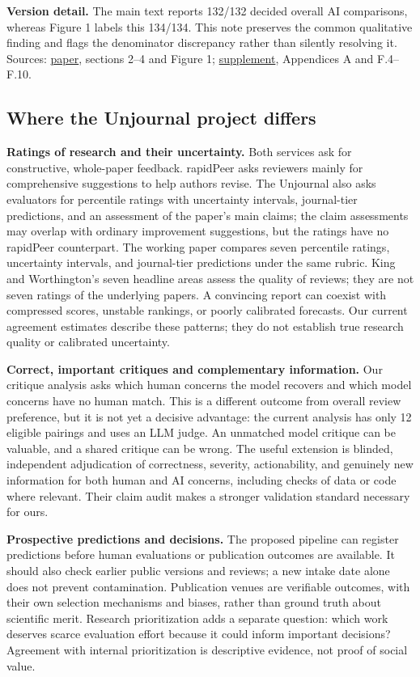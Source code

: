 \documentclass[
  11pt,
  letterpaper,
]{article}
\begin{document}
\textbf{Version detail.} The main text reports 132/132 decided overall
AI comparisons, whereas Figure 1 labels this 134/134. This note
preserves the common qualitative finding and flags the denominator
discrepancy rather than silently resolving it. Sources:
\href{https://gking.harvard.edu/files/peerless.pdf}{paper}, sections
2--4 and Figure 1;
\href{https://gking.harvard.edu/files/peerless-supp.pdf}{supplement},
Appendices A and F.4--F.10.

\subsection{Where the Unjournal project
differs}\label{where-the-unjournal-project-differs}

\textbf{Ratings of research and their uncertainty.} Both services ask
for constructive, whole-paper feedback. rapidPeer asks reviewers mainly
for comprehensive suggestions to help authors revise. The Unjournal also
asks evaluators for percentile ratings with uncertainty intervals,
journal-tier predictions, and an assessment of the paper's main claims;
the claim assessments may overlap with ordinary improvement suggestions,
but the ratings have no rapidPeer counterpart. The working paper
compares seven percentile ratings, uncertainty intervals, and
journal-tier predictions under the same rubric. King and Worthington's
seven headline areas assess the quality of reviews; they are not seven
ratings of the underlying papers. A convincing report can coexist with
compressed scores, unstable rankings, or poorly calibrated forecasts.
Our current agreement estimates describe these patterns; they do not
establish true research quality or calibrated uncertainty.

\textbf{Correct, important critiques and complementary information.} Our
critique analysis asks which human concerns the model recovers and which
model concerns have no human match. This is a different outcome from
overall review preference, but it is not yet a decisive advantage: the
current analysis has only 12 eligible pairings and uses an LLM judge. An
unmatched model critique can be valuable, and a shared critique can be
wrong. The useful extension is blinded, independent adjudication of
correctness, severity, actionability, and genuinely new information for
both human and AI concerns, including checks of data or code where
relevant. Their claim audit makes a stronger validation standard
necessary for ours.

\textbf{Prospective predictions and decisions.} The proposed pipeline
can register predictions before human evaluations or publication
outcomes are available. It should also check earlier public versions and
reviews; a new intake date alone does not prevent contamination.
Publication venues are verifiable outcomes, with their own selection
mechanisms and biases, rather than ground truth about scientific merit.
Research prioritization adds a separate question: which work deserves
scarce evaluation effort because it could inform important decisions?
Agreement with internal prioritization is descriptive evidence, not
proof of social value.
\end{document}
